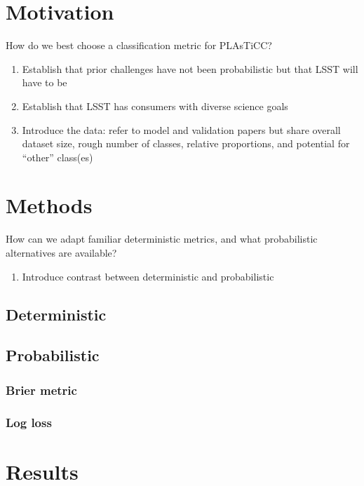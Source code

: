 \documentclass[iop]{emulateapj}
\newcommand{\plasticc}{PLAsTiCC}
\begin{document}
\section{Motivation}
\label{sec:motivation}

How do we best choose a classification metric for \plasticc?

\begin{enumerate}
	\item Establish that prior challenges have not been probabilistic but 
that LSST will have to be
	\item Establish that LSST has consumers with diverse science goals
	\item Introduce the data: refer to model and validation papers but 
share overall dataset size, rough number of classes, relative proportions, and 
potential for ``other'' class(es)
\end{enumerate}

\section{Methods}
\label{sec:methods}

How can we adapt familiar deterministic metrics, and what probabilistic 
alternatives are available?

\begin{enumerate}
	\item Introduce contrast between deterministic and probabilistic
\end{enumerate}

\subsection{Deterministic}

\subsection{Probabilistic}

\subsubsection{Brier metric}

\subsubsection{Log loss}

\section{Results}
\label{sec:results}
\end{document}
